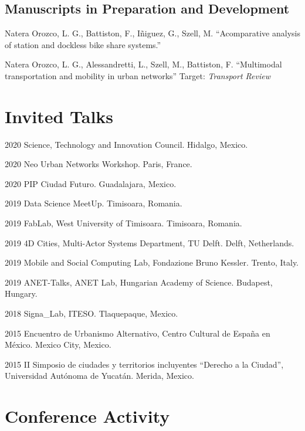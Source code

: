 \documentclass{academiccv}
\begin{document}

\subsection*{Manuscripts in Preparation and Development}
\begin{tablist}
	\item[\the\year] Natera Orozco, L. G., Battiston, F., I\~niguez, G., Szell, M. \enquote{Acomparative analysis of station and dockless bike share systems.} 
	\item[\the\year] Natera Orozco, L. G., Alessandretti, L., Szell, M., Battiston, F. \enquote{Multimodal transportation and mobility in urban networks} Target: \textit{Transport Review}
\end{tablist}


\section*{Invited Talks}
\begin{tablist}
	\item[2020] \tab Science, Technology and Innovation Council. Hidalgo, Mexico.
	\item[2020] \tab Neo Urban Networks Workshop. Paris, France.
	\item[2020] \tab PIP Ciudad Futuro. Guadalajara, Mexico.
	\item[2019] \tab Data Science MeetUp. Timisoara, Romania.
	\item[2019] \tab FabLab, West University of Timisoara. Timisoara, Romania.
	\item[2019] \tab 4D Cities, Multi-Actor Systems Department, TU Delft. Delft, Netherlands.
	\item[2019] \tab Mobile and Social Computing Lab, Fondazione Bruno Kessler. Trento, Italy.
	\item[2019] \tab ANET-Talks, ANET Lab, Hungarian Academy of Science. Budapest, Hungary.
	\item[2018] \tab Signa\_Lab, ITESO. Tlaquepaque, Mexico.
	\item[2015] \tab Encuentro de Urbanismo Alternativo, Centro Cultural de España en México. Mexico City, Mexico.
	\item[2015] \tab II Simposio de ciudades y territorios incluyentes \enquote{Derecho a la Ciudad}, Universidad Autónoma de Yucatán. Merida, Mexico.
\end{tablist}

\section*{Conference Activity}
\end{document}
